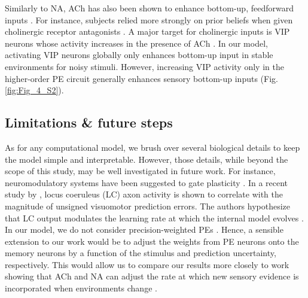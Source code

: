 \documentclass[10pt,a4paper]{article}
\begin{document}
Similarly to NA, ACh has also been shown to enhance bottom-up, feedforward inputs \citep[reviewed in, e.g.,][]{yu2005uncertainty, marshall2016pharmacological}. For instance, subjects relied more strongly on prior beliefs when given cholinergic receptor antagonists \citep{marshall2016pharmacological}. A major target for cholinergic inputs is VIP neurons whose activity increases in the presence of ACh \citep[reviewed in, e.g.,][]{wester2014behavioral, hattori2017functions, swanson2019hiring}. In our model, activating VIP neurons globally only enhances bottom-up input in stable environments for noisy stimuli. However, increasing VIP activity only in the higher-order PE circuit generally enhances sensory bottom-up inputs (Fig. \ref{fig:Fig_4_S2}).


\subsection*{Limitations \& future steps}
%
As for any computational model, we brush over several biological details to keep the model simple and interpretable. However, those details, while beyond the scope of this study, may be well investigated in future work. For instance, neuromodulatory systems have been suggested to gate plasticity \citep{pawlak2010timing}. In a recent study by \cite{jordan2023locus}, locus coeruleus (LC) axon activity is shown to correlate with the magnitude of unsigned visuomotor prediction errors. The authors hypothesize that LC output modulates the learning rate at which the internal model evolves \citep{jordan2023locus}. In our model, we do not consider precision-weighted PEs \citep[but see][]{wilmes2023uncertainty, granier2023precision}. Hence, a sensible extension to our work would be to adjust the weights from PE neurons onto the memory neurons by a function of the stimulus and prediction uncertainty, respectively. This would allow us to compare our results more closely to work showing that ACh and NA can adjust the rate at which new sensory evidence is incorporated when environments change \citep{marshall2016pharmacological, bruckner2022understanding}.
\end{document}
